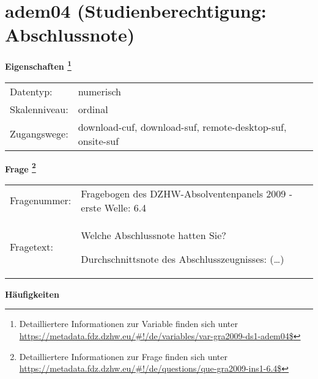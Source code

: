 
    \setcounter{footnote}{0}

    \vspace*{-1.8cm}
	\section{adem04 (Studienberechtigung: Abschlussnote)}
	\label{section:adem04}



    \vspace*{0.5cm}
    \noindent\textbf{Eigenschaften
	\footnote{Detailliertere Informationen zur Variable finden sich unter
		\url{https://metadata.fdz.dzhw.eu/\#!/de/variables/var-gra2009-ds1-adem04$}}}\\
	\begin{tabularx}{\hsize}{@{}lX}
	Datentyp: & numerisch \\
	Skalenniveau: & ordinal \\
	Zugangswege: &
	  download-cuf, 
	  download-suf, 
	  remote-desktop-suf, 
	  onsite-suf
 \\
    \end{tabularx}



				\vspace*{0.5cm}
                \noindent\textbf{Frage
	                \footnote{Detailliertere Informationen zur Frage finden sich unter
		              \url{https://metadata.fdz.dzhw.eu/\#!/de/questions/que-gra2009-ins1-6.4$}}}\\
				\begin{tabularx}{\hsize}{@{}lX}
					Fragenummer: &
					  Fragebogen des DZHW-Absolventenpanels 2009 - erste Welle:
					  6.4
 \\
					Fragetext: & Welche Abschlussnote hatten Sie?\par  Durchschnittsnote des Abschlusszeugnisses: (…) \\
				\end{tabularx}





        		\vspace*{0.5cm}
                \noindent\textbf{Häufigkeiten}

